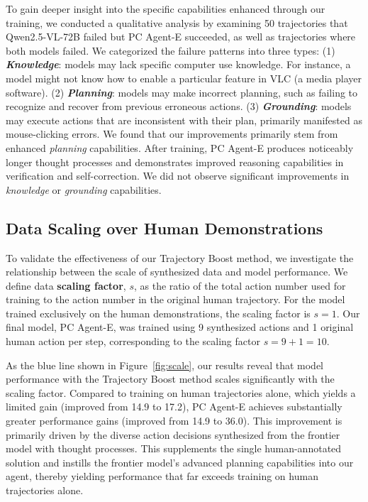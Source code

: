 \documentclass{article} %
\begin{document}
To gain deeper insight into the specific capabilities enhanced through our training, we conducted a qualitative analysis by examining 50 trajectories that Qwen2.5-VL-72B failed but PC Agent-E succeeded, as well as trajectories where both models failed. We categorized the failure patterns into three types: (1) \textbf{\textit{Knowledge}}: models may lack specific computer use knowledge. For instance, a model might not know how to enable a particular feature in VLC (a media player software). (2) \textbf{\textit{Planning}}: models may make incorrect planning, such as failing to recognize and recover from previous erroneous actions. (3) \textbf{\textit{Grounding}}: models may execute actions that are inconsistent with their plan, primarily manifested as mouse-clicking errors. We found that our improvements primarily stem from enhanced \textit{planning} capabilities. After training, PC Agent-E produces noticeably longer thought processes and demonstrates improved reasoning capabilities in verification and self-correction. We did not observe significant improvements in \textit{knowledge} or \textit{grounding} capabilities.

\subsection{Data Scaling over Human Demonstrations}
\label{subsec:train_data_scaling}

To validate the effectiveness of our Trajectory Boost method, we investigate the relationship between the scale of synthesized data and model performance. We define data \textbf{scaling factor}, $s$, as the ratio of the total action number used for training to the action number in the original human trajectory. For the model trained exclusively on the human demonstrations, the scaling factor is $s=1$. Our final model, PC Agent-E, was trained using 9 synthesized actions and 1 original human action per step, corresponding to the scaling factor $s=9+1=10$.

As the blue line shown in Figure~\ref{fig:scale}, our results reveal that model performance with the Trajectory Boost method scales significantly with the scaling factor. Compared to training on human trajectories alone, which yields a limited gain (improved from 14.9 to 17.2), PC Agent-E achieves substantially greater performance gains (improved from 14.9 to 36.0). This improvement is primarily driven by the diverse action decisions synthesized from the frontier model with thought processes. This supplements the single human-annotated solution and instills the frontier model's advanced planning capabilities into our agent, thereby yielding performance that far exceeds training on human trajectories alone.
\end{document}
